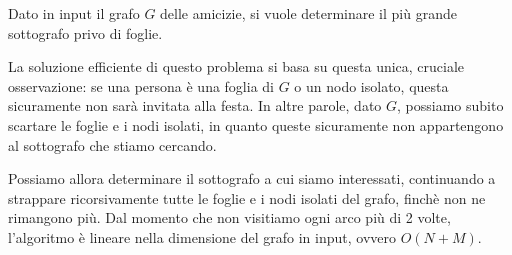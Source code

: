 
Dato in input il grafo $G$ delle amicizie, si vuole determinare il più grande sottografo privo di foglie.

La soluzione efficiente di questo problema si basa su questa unica, cruciale osservazione: se una persona è una foglia di $G$ o un nodo isolato, questa sicuramente non sarà invitata alla festa. In altre parole, dato $G$, possiamo subito scartare le foglie e i nodi isolati, in quanto queste sicuramente non appartengono al sottografo che stiamo cercando. 

Possiamo allora determinare il sottografo a cui siamo interessati, continuando a strappare ricorsivamente tutte le foglie e i nodi isolati del grafo, finchè non ne rimangono più. Dal momento che non visitiamo ogni arco più di 2 volte, l'algoritmo è lineare nella dimensione del grafo in input, ovvero $O(N + M)$.

\Implementazione
\colorbox{white}{}